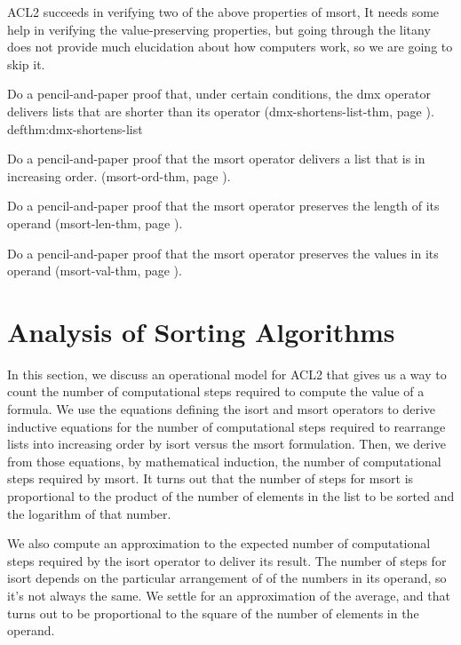 ACL2 succeeds in verifying two of the above properties of msort,
It needs some help in verifying the value-preserving
properties, but going through the litany does not provide
much elucidation about how computers work, so we are going to skip it.

\begin{ExerciseList}
\Exercise
Do a pencil-and-paper proof that, under certain conditions, the dmx operator
delivers lists that are shorter than its operator
(dmx-shortens-list-thm, page \pageref{defthm:dmx-shortens-list}).
{defthm:dmx-shortens-list}

\Exercise
Do a pencil-and-paper proof that the msort operator
delivers a list that is in increasing order.
(msort-ord-thm, page \pageref{defthm:msort-ord}).

\Exercise
Do a pencil-and-paper proof that the msort operator
preserves the length of its operand
(msort-len-thm, page \pageref{defthm:msort-len}).

\Exercise
Do a pencil-and-paper proof that the msort operator
preserves the values in its operand
(msort-val-thm, page \pageref{defthm:msort-val}).
\end{ExerciseList}

\section{Analysis of Sorting Algorithms}
\label{sec:sort-analysis}

In this section, we discuss an operational model for ACL2
that gives us a way to count the number of computational steps required
to compute the value of a formula. We use the equations defining
the isort and msort operators to derive inductive equations
for the number of computational steps required to rearrange lists
into increasing order by isort versus the msort formulation.
Then, we derive from those equations, by mathematical induction,
the number of computational steps required by msort.
It turns out that the number of steps for msort
is proportional to the product of
the number of elements in the list to be sorted
and the logarithm of that number.

We also compute an approximation to the expected number of computational steps
required by the isort operator to deliver its result.
The number of steps for isort depends on the particular arrangement of
of the numbers in its operand, so it's not always the same.
We settle for an approximation of the average, and that turns out to
be proportional to the square of the number of elements in
the operand.


